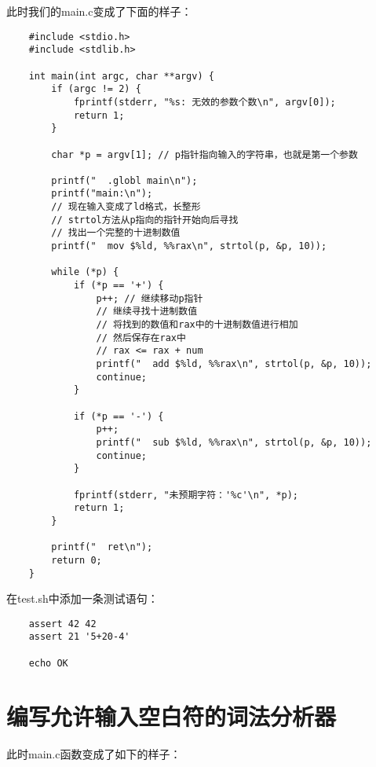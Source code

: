 \documentclass[cn,10pt,math=newtx,citestyle=gb7714-2015,bibstyle=gb7714-2015]{elegantbook}
\begin{document}
此时我们的main.c变成了下面的样子：

\begin{verbatim}
    #include <stdio.h>
    #include <stdlib.h>

    int main(int argc, char **argv) {
        if (argc != 2) {
            fprintf(stderr, "%s: 无效的参数个数\n", argv[0]);
            return 1;
        }

        char *p = argv[1]; // p指针指向输入的字符串，也就是第一个参数

        printf("  .globl main\n");
        printf("main:\n");
        // 现在输入变成了ld格式，长整形
        // strtol方法从p指向的指针开始向后寻找
        // 找出一个完整的十进制数值
        printf("  mov $%ld, %%rax\n", strtol(p, &p, 10));

        while (*p) {
            if (*p == '+') {
                p++; // 继续移动p指针
                // 继续寻找十进制数值
                // 将找到的数值和rax中的十进制数值进行相加
                // 然后保存在rax中
                // rax <= rax + num
                printf("  add $%ld, %%rax\n", strtol(p, &p, 10));
                continue;
            }

            if (*p == '-') {
                p++;
                printf("  sub $%ld, %%rax\n", strtol(p, &p, 10));
                continue;
            }

            fprintf(stderr, "未预期字符：'%c'\n", *p);
            return 1;
        }

        printf("  ret\n");
        return 0;
    }
\end{verbatim}

在test.sh中添加一条测试语句：

\begin{verbatim}
    assert 42 42
    assert 21 '5+20-4'

    echo OK
\end{verbatim}

\chapter{编写允许输入空白符的词法分析器}

此时main.c函数变成了如下的样子：
\end{document}
